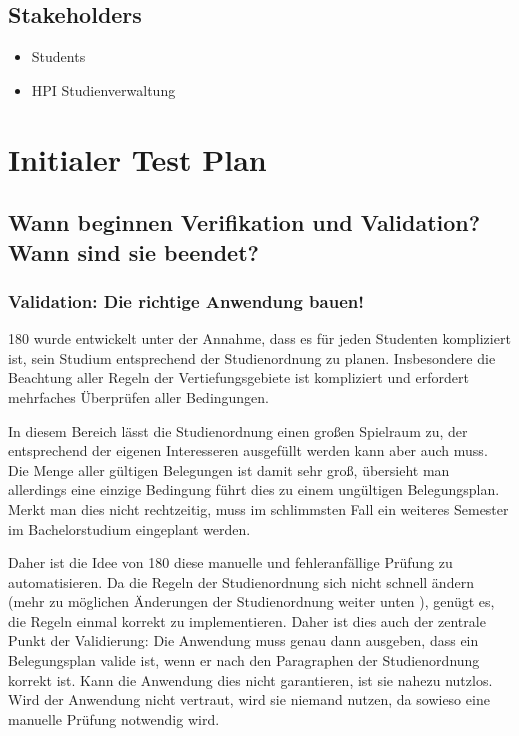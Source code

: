\documentclass[ngerman]{article}
\begin{document}
\subsection{Stakeholders}

\begin{itemize}
    \item Students
    \item HPI Studienverwaltung
\end{itemize}

\section{Initialer Test Plan}

\subsection{Wann beginnen Verifikation und Validation? Wann sind sie beendet?}

\subsubsection{Validation: Die richtige Anwendung bauen!}

180 wurde entwickelt unter der Annahme, dass es für jeden Studenten kompliziert ist, sein Studium entsprechend der Studienordnung zu planen.
Insbesondere die Beachtung aller Regeln der Vertiefungsgebiete ist kompliziert und erfordert mehrfaches Überprüfen aller Bedingungen.

In diesem Bereich lässt die Studienordnung einen großen Spielraum zu, der entsprechend der eigenen Interesseren ausgefüllt werden kann aber auch muss.
Die Menge aller gültigen Belegungen ist damit sehr groß, übersieht man allerdings eine einzige Bedingung führt dies zu einem ungültigen Belegungsplan.
Merkt man dies nicht rechtzeitig, muss im schlimmsten Fall ein weiteres Semester im Bachelorstudium eingeplant werden.

Daher ist die Idee von 180 diese manuelle und fehleranfällige Prüfung zu automatisieren.
Da die Regeln der Studienordnung sich nicht schnell ändern (mehr zu möglichen Änderungen der Studienordnung weiter unten ), genügt es, die Regeln einmal korrekt zu implementieren.
Daher ist dies auch der zentrale Punkt der Validierung:
Die Anwendung muss genau dann ausgeben, dass ein Belegungsplan valide ist, wenn er nach den Paragraphen der Studienordnung korrekt ist.
Kann die Anwendung dies nicht garantieren, ist sie nahezu nutzlos.
Wird der Anwendung nicht vertraut, wird sie niemand nutzen, da sowieso eine manuelle Prüfung notwendig wird.
\end{document}
